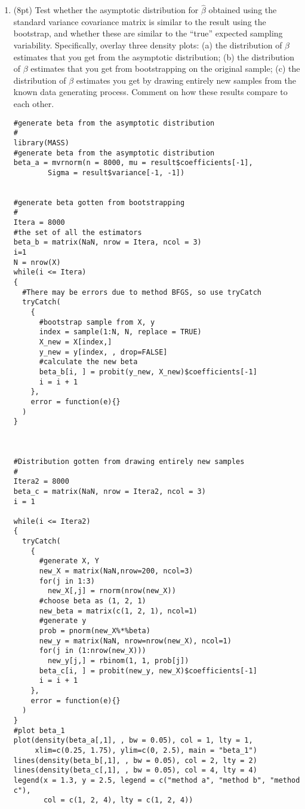 \documentclass[11pt,english]{article}
\begin{document}
\begin{enumerate}
\item (8pt) Test whether the asymptotic distribution for $\hat{\beta}$ obtained using the standard variance covariance matrix is similar to the result using the bootstrap, and whether these are similar to the ``true'' expected sampling variability.  Specifically, overlay three density plots: (a) the distribution of $\beta$ estimates that you get from the asymptotic distribution; (b) the distribution of $\beta$ estimates that you get from bootstrapping on the original sample; (c) the distribution of $\beta$ estimates you get by drawing entirely new samples from the known data generating process. Comment on how these results compare to each other.\\
\begin{verbatim}
#generate beta from the asymptotic distribution
#
library(MASS)
#generate beta from the asymptotic distribution
beta_a = mvrnorm(n = 8000, mu = result$coefficients[-1],
        Sigma = result$variance[-1, -1])


#generate beta gotten from bootstrapping
#
Itera = 8000
#the set of all the estimators
beta_b = matrix(NaN, nrow = Itera, ncol = 3)
i=1
N = nrow(X)
while(i <= Itera)
{
  #There may be errors due to method BFGS, so use tryCatch
  tryCatch(
    {
      #bootstrap sample from X, y
      index = sample(1:N, N, replace = TRUE)
      X_new = X[index,]
      y_new = y[index, , drop=FALSE]
      #calculate the new beta
      beta_b[i, ] = probit(y_new, X_new)$coefficients[-1]
      i = i + 1
    },
    error = function(e){}
  )
}



#Distribution gotten from drawing entirely new samples
#
Itera2 = 8000
beta_c = matrix(NaN, nrow = Itera2, ncol = 3)
i = 1

while(i <= Itera2)
{
  tryCatch(
    {
      #generate X, Y
      new_X = matrix(NaN,nrow=200, ncol=3)
      for(j in 1:3)
        new_X[,j] = rnorm(nrow(new_X))
      #choose beta as (1, 2, 1)
      new_beta = matrix(c(1, 2, 1), ncol=1)
      #generate y
      prob = pnorm(new_X%*%beta)
      new_y = matrix(NaN, nrow=nrow(new_X), ncol=1)
      for(j in (1:nrow(new_X)))
        new_y[j,] = rbinom(1, 1, prob[j])
      beta_c[i, ] = probit(new_y, new_X)$coefficients[-1]
      i = i + 1
    },
    error = function(e){}
  )
}
#plot beta_1
plot(density(beta_a[,1], , bw = 0.05), col = 1, lty = 1,
     xlim=c(0.25, 1.75), ylim=c(0, 2.5), main = "beta_1")
lines(density(beta_b[,1], , bw = 0.05), col = 2, lty = 2)
lines(density(beta_c[,1], , bw = 0.05), col = 4, lty = 4)
legend(x = 1.3, y = 2.5, legend = c("method a", "method b", "method c"),
       col = c(1, 2, 4), lty = c(1, 2, 4))


\end{verbatim}
\end{enumerate}
\end{document}
